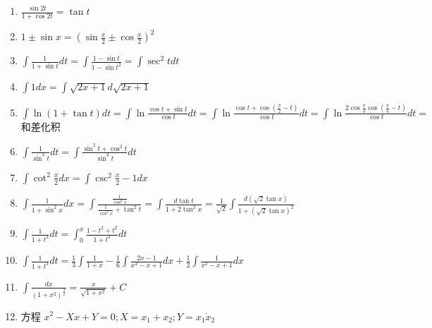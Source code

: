 \documentclass[UTF8]{ctexart}
\begin{document}
\begin{enumerate}
  \item $\frac{\sin 2t }{1+ \cos 2t}=\tan t$ \\
  \item $1 \pm \sin x ={(\sin \frac{x}{2} \pm \cos \frac{x}{2})}^2$ \\
  \item $\int \frac{1}{1+ \sin t }dt = \int \frac{1-\sin t}{1-{\sin t}^2}=\int \sec^2 tdt$ \\
  \item $\int 1 dx =\int \sqrt{2x+1} d \sqrt{2x+1}$ \\
  \item $\int \ln{(1+ \tan t)} dt = \int \ln \frac{\cos t +\sin t}{\cos t}dt=
  \int \ln \frac{\cos t + \cos (\frac{\pi}{2} -t ) }{\cos t} dt =
  \int \ln \frac{2 \cos \frac{\pi}{4} \cos (\frac{\pi}{4} -t)}{\cos t}dt =
$和差化积 \\
  \item $\int \frac{1}{\sin^3 t}dt =
\int \frac{\sin^2 t + \cos^2 t}{\sin^3 t }dt$
  \item $\int \cot^2 \frac{x}{2} dx= \int \csc^2 \frac{x}{2} -1 dx $
  \item $ \int \frac{1}{1+\sin^2 x} dx =\int \frac{\frac{1}{\cos^2 x}}{\frac {1}{\cos^2 x } + \tan^2 t}
  = \int \frac {d \tan t}{1+ 2\tan^2 x}
  = \frac{1}{\sqrt{2}} \int \frac{d ( \sqrt {2} \tan x)}{1+ {(\sqrt{2} \tan x)}^2}$
  \item $\int \frac{1}{1+t^3}dt=\int_0^x\frac{1-t^2+t^2}{1+t^3}dt$
  \item $\int \frac{1}{1+t^3}dt=\frac{1}{3} \int\frac{1}{1+x} -\frac{1}{6}\int \frac{2x-1}{x^2-x+1}dx +\frac{1}{2} \int \frac{1}{x^2-x+1} dx$
  \item $\int \frac{dx}{{(1+x^2)}^\frac{3}{2}}=\frac{x}{\sqrt{1+x^2}} +C $ \\
  \item 方程 $x^2 -Xx+Y=0 ;X=x_1+x_2 ; Y=x_1 \dot x_2 $


\end{enumerate}
\end{document}
